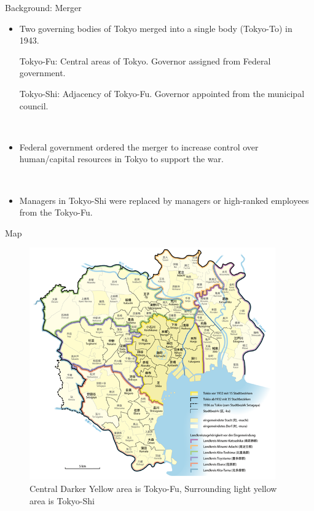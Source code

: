 \begin{frame}{Background: Merger}
    \begin{itemize}
        \item Two governing bodies of Tokyo merged into a single body (Tokyo-To) in 1943.

        Tokyo-Fu: Central areas of Tokyo. Governor assigned from Federal government.
        
        Tokyo-Shi: Adjacency of Tokyo-Fu. Governor appointed from the municipal council.

        \

        \item Federal government ordered the merger to increase control over human/capital resources in Tokyo to support the war.
        
        \

        \item Managers in Tokyo-Shi were replaced by managers or high-ranked employees from the Tokyo-Fu.

    \end{itemize}
\end{frame}

\begin{frame}{Map}
    \begin{figure}
        \centering
        \includegraphics[height = 0.8\textheight]{Background/Map.png}
        \caption{Central Darker Yellow area is Tokyo-Fu, Surrounding light yellow area is Tokyo-Shi}
        \label{fig:enter-label}
    \end{figure}
\end{frame}

